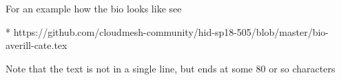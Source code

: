 For an example how the bio looks like see

* https://github.com/cloudmesh-community/hid-sp18-505/blob/master/bio-averill-cate.tex

Note that the text is not in a single line, but ends at some 80 or so characters
